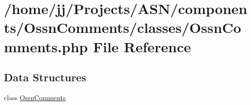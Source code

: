 \hypertarget{classes_2_ossn_comments_8php}{}\section{/home/jj/\+Projects/\+A\+S\+N/components/\+Ossn\+Comments/classes/\+Ossn\+Comments.php File Reference}
\label{classes_2_ossn_comments_8php}
\subsection*{Data Structures}
\begin{DoxyCompactItemize}
\item 
class \hyperlink{class_ossn_comments}{Ossn\+Comments}
\end{DoxyCompactItemize}
